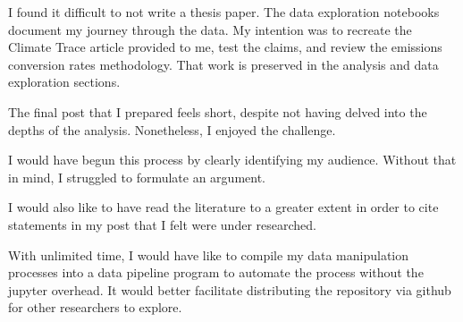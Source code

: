 \documentclass[letterpaper,10pt,english]{jupyterBook}
\begin{document}
\begin{DUlineblock}{0em}
\item[] 
\end{DUlineblock}

\begin{DUlineblock}{0em}
\item[] 
\end{DUlineblock}

\sphinxAtStartPar
I found it difficult to not write a thesis paper.  The data exploration notebooks document my journey through the data.  My intention was to recreate the Climate Trace article provided to me, test the claims, and review the emissions conversion rates methodology.  That work is preserved in the analysis and data exploration sections.

\sphinxAtStartPar
The final post that I prepared feels short, despite not having delved into the depths of the analysis.  Nonetheless, I enjoyed the challenge.

\begin{DUlineblock}{0em}
\item[] 
\end{DUlineblock}

\sphinxAtStartPar
I would have begun this process by clearly identifying my audience.  Without that in mind, I struggled to formulate an argument.

\sphinxAtStartPar
I would also like to have read the literature to a greater extent in order to cite statements in my post that I felt were under researched.

\begin{DUlineblock}{0em}
\item[] 
\end{DUlineblock}

\begin{DUlineblock}{0em}
\item[] 
\end{DUlineblock}

\sphinxAtStartPar
With unlimited time, I would have like to compile my data manipulation processes into a data pipeline program to automate the process without the jupyter overhead.  It would better facilitate distributing the repository via github for other researchers to explore.
\end{document}
